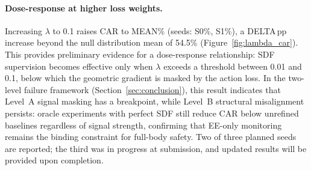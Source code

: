 
\paragraph{Dose-response at higher loss weights.}\label{sec:lambda_high}
Increasing $\lambda$ to 0.1 raises CAR to {MEAN}\% (seeds: {S0}\%, {S1}\%), a {DELTA}\,pp increase beyond the null distribution mean of 54.5\% (Figure~\ref{fig:lambda_car}). This provides preliminary evidence for a dose-response relationship: SDF supervision becomes effective only when $\lambda$ exceeds a threshold between 0.01 and 0.1, below which the geometric gradient is masked by the action loss. In the two-level failure framework (Section~\ref{sec:conclusion}), this result indicates that Level~A signal masking has a breakpoint, while Level~B structural misalignment persists: oracle experiments with perfect SDF still reduce CAR below unrefined baselines regardless of signal strength, confirming that EE-only monitoring remains the binding constraint for full-body safety. Two of three planned seeds are reported; the third was in progress at submission, and updated results will be provided upon completion.



%
%

%
%

